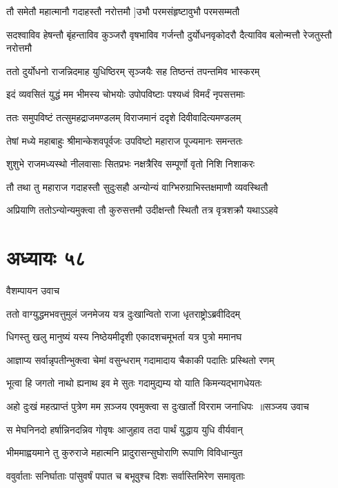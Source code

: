 \twolineshloka
{तौ समेतौ महात्मानौ गदाहस्तौ नरोत्तमौ}
{]उभौ परमसंहृष्टावुभौ परमसम्मतौ}


\threelineshloka
{सदश्वाविव हेषन्तौ बृंहन्ताविव कुञ्जरौ}
{वृषभाविव गर्जन्तौ दुर्योधनवृकोदरौ}
{दैत्याविव बलोन्मत्तौ रेजतुस्तौ नरोत्तमौ}


\twolineshloka
{ततो दुर्योधनो राजन्निदमाह युधिष्ठिरम्}
{सृञ्जयैः सह तिष्ठन्तं तपन्तमिव भास्करम्}


\twolineshloka
{इदं व्यवसितं युद्धं मम भीमस्य चोभयोः}
{उपोपविष्टाः पश्यध्वं विमर्दं नृपसत्तमाः}


\twolineshloka
{ततः समुपविष्टं तत्सुमहद्राजमण्डलम्}
{विराजमानं ददृशे दिवीवादित्यमण्डलम्}


\twolineshloka
{तेषां मध्ये महाबाहुः श्रीमान्केशवपूर्वजः}
{उपविष्टो महाराज पूज्यमानः समन्ततः}


\twolineshloka
{शुशुभे राजमध्यस्थो नीलवासाः सितप्रभः}
{नक्षत्रैरिव सम्पूर्णो वृतो निशि निशाकरः}


\twolineshloka
{तौ तथा तु महाराज गदाहस्तौ सुदुःसहौ}
{अन्योन्यं वाग्भिरुग्राभिस्तक्षमाणौ व्यवस्थितौ}


\twolineshloka
{अप्रियाणि ततोऽन्योन्यमुक्त्वा तौ कुरुसत्तमौ}
{उदीक्षन्तौ स्थितौ तत्र वृत्रशक्रौ यथाऽऽहवे}


\chapter{अध्यायः ५८}
\twolineshloka
{वैशम्पायन उवाच}
{}


\twolineshloka
{ततो वाग्युद्धमभवत्तुमुलं जनमेजय}
{यत्र दुःखान्वितो राजा धृतराष्ट्रोऽब्रवीदिदम्}


\twolineshloka
{धिगस्तु खलु मानुष्यं यस्य निष्ठेयमीदृशी}
{एकादशचमूभर्ता यत्र पुत्रो ममानघ}


\twolineshloka
{आज्ञाप्य सर्वान्नृपतीन्भुक्त्वा चेमां वसुन्धराम्}
{गदामादाय चैकाकी पदातिः प्रस्थितो रणम्}


\twolineshloka
{भूत्वा हि जगतो नाथो ह्यनाथ इव मे सुतः}
{गदामुद्यम्य यो याति किमन्यद्भागधेयतः}


\threelineshloka
{अहो दुःखं महत्प्राप्तं पुत्रेण मम स़ञ्जय}
{एवमुक्त्वा स दुःखार्तो विरराम जनाधिपः ॥सञ्जय उवाच}
{}


\twolineshloka
{स मेघनिनदो हर्षान्निनदन्निव गोवृषः}
{आजुहाव तदा पार्थं युद्धाय युधि वीर्यवान्}


\twolineshloka
{भीममाह्वयमाने तु कुरुराजे महात्मनि}
{प्रादुरासन्सुघोराणि रूपाणि विविधान्युत}


\twolineshloka
{ववुर्वाताः सनिर्घाताः पांसुवर्षं पपात च}
{बभूवुश्च दिशः सर्वास्तिमिरेण समावृताः}


